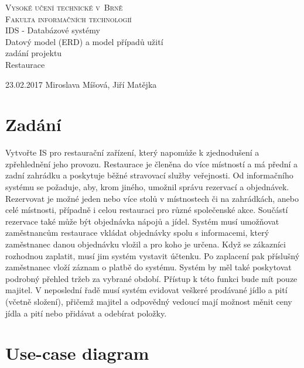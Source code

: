 \documentclass[11pt, a4paper]{article}[]
\begin{document}
	\thispagestyle{empty}

	\begin{center}
		\Huge
			\textsc{Vysoké učení technické v~Brně\\}
		\huge
			\textsc{Fakulta informačních technologií\\}
		\LARGE
			IDS - Databázové systémy \\
		\Huge
			Datový model (ERD) a model případů užití \\
		
		\LARGE	zadání projektu\\
			Restaurace \\
	\end{center}
		{\Large 23.02.2017 \hfill Miroslava Míšová, Jiří Matějka} %


	\pagebreak  %
	\setcounter{page}{1}  %


	\section{Zadání}
	Vytvořte IS pro restaurační zařízení, který napomůže k zjednodušení a zpřehlednění jeho provozu. Restaurace je členěna do více místností a má přední a zadní zahrádku a poskytuje běžné stravovací služby veřejnosti. Od informačního systému se požaduje, aby, krom jiného, umožnil správu rezervací a objednávek. Rezervovat je možné jeden nebo více stolů v místnostech či na zahrádkách, anebo celé místnosti, případně i celou restauraci pro různé společenské akce. Součástí rezervace také může být objednávka nápojů a jídel. Systém musí umožňovat zaměstnancům restaurace vkládat objednávky spolu s informacemi, který zaměstnanec danou objednávku vložil a pro koho je určena. Když se zákazníci rozhodnou zaplatit, musí jim systém vystavit účtenku. Po zaplacení pak příslušný zaměstnanec vloží záznam o platbě do systému. Systém by měl také poskytovat podrobný přehled tržeb za vybrané období. Přístup k této funkci bude mít pouze majitel. V neposlední řadě musí systém evidovat veškeré prodávané jídlo a pití (včetně složení), přičemž majitel a odpovědný vedoucí mají možnost měnit ceny jídla a pití nebo přidávat a odebírat položky. 
	

	\section{Use-case diagram}  
\end{document}
